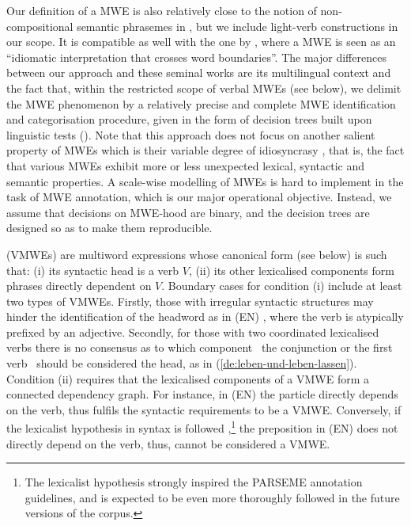 \documentclass[output=paper,modfonts]{langscibook}
\begin{document}
Our definition of a MWE is also relatively close to the notion of non-com\-po\-si\-tio\-nal semantic phrasemes in \citet{Melcuk10}, but we include light-verb constructions in our scope. It is compatible as well with the one by \citet{Sag2002a}, where a MWE is seen as an ``idiomatic interpretation that crosses word boundaries''. The major differences between our approach and these seminal works are its multilingual context and the fact that, within the restricted scope of verbal MWEs (see below), we delimit the MWE phenomenon by a relatively precise and complete MWE identification and categorisation procedure, given in the form of decision trees built upon linguistic tests (). Note that this approach does not focus on another salient property of MWEs which is their variable degree of idiosyncrasy \citep{GastonGross88}, that is, the fact that various MWEs exhibit more or less unexpected lexical, syntactic and semantic properties. A scale-wise modelling of MWEs is hard to implement in the task of MWE annotation, which is our major operational objective. Instead, we assume that decisions on MWE-hood are binary, and the decision trees are designed so as to make them reproducible. 

 (VMWEs) are multiword expressions whose canonical form (see below) is such that: (i) its syntactic head is a verb $V$, (ii) its other lexicalised components form phrases directly dependent on $V$. Boundary cases for condition (i) include at least two types of VMWEs. Firstly, those with irregular syntactic structures may hinder the identification of the headword as in (EN) , where the verb is atypically prefixed by an adjective. Secondly, for those with two coordinated lexicalised verbs there is no consensus as to which component \textendash~the conjunction or the first verb \textendash~should be considered the head, as in (\ref{de:leben-und-leben-lassen}).
Condition (ii) requires that the lexicalised components of a VMWE form a connected dependency graph. For instance, in (EN)  the particle  directly depends on the verb, thus  fulfils the syntactic requirements to be a VMWE. Conversely, if the lexicalist hypothesis in syntax is followed \citep{de2014universal},\footnote{The lexicalist hypothesis strongly inspired the PARSEME annotation guidelines, and is expected to be even more thoroughly followed in the future versions of the corpus.} the preposition  in (EN)  does not directly depend on the verb, thus,  cannot be considered a VMWE.
\end{document}
